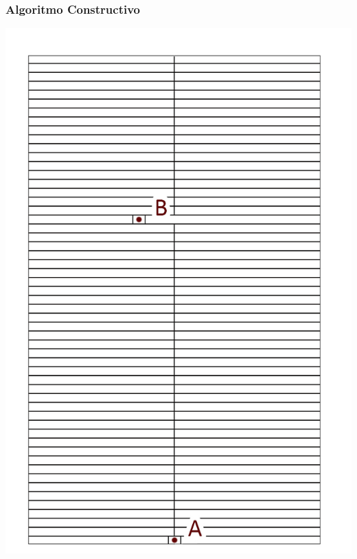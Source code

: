 \begin{frame}
    \frametitle{Algoritmo Constructivo}
    \endblock{}
		\begin{center}
    \includegraphics[height=0.8\textheight]{FIGURES/paso2}
		\end{center}
\end{frame}

